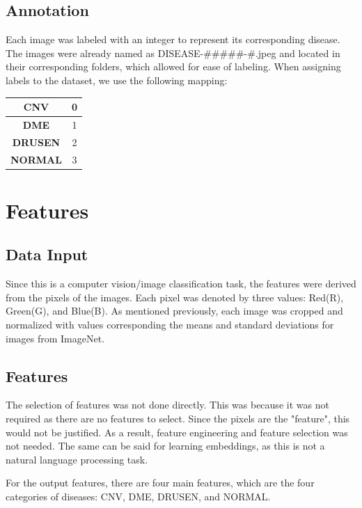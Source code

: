 \documentclass[11pt]{article}
\begin{document}
\subsection{Annotation}
Each image was labeled with an integer to represent its corresponding disease. The images were already named as DISEASE-\#\#\#\#\#-\#.jpeg and located in their corresponding folders, which allowed for ease of labeling. When assigning labels to the dataset, we use the following mapping:

\begin{center}
  \begin{tabular}{| c | c |}
    \hline \hline
    \textbf{CNV}    & 0 \\
    \hline
    \textbf{DME}    & 1 \\
    \hline
    \textbf{DRUSEN} & 2 \\
    \hline
    \textbf{NORMAL} & 3 \\
    \hline \hline
  \end{tabular}
\end{center}

\section{Features}

\subsection{Data Input}
Since this is a computer vision/image classification task, the features were derived from the pixels of the images. Each pixel was denoted by three values: Red(R), Green(G), and Blue(B). As mentioned previously, each image was cropped and normalized with values corresponding the means and standard deviations for images from ImageNet.

\subsection{Features}
The selection of features was not done directly. This was because it was not required as there are no features to select. Since the pixels are the "feature", this would not be justified. As a result, feature engineering and feature selection was not needed. The same can be said for learning embeddings, as this is not a natural language processing task.

For the output features, there are four main features, which are the four categories of diseases: CNV, DME, DRUSEN, and NORMAL.
\end{document}
